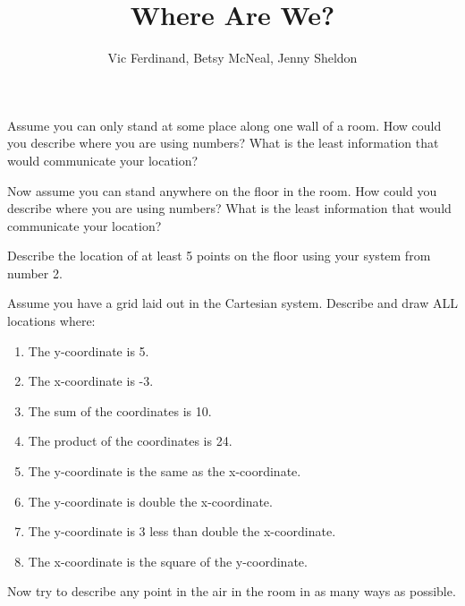 \documentclass{ximera}
\title{Where Are We?}
\author{Vic Ferdinand, Betsy McNeal, Jenny Sheldon}
\begin{document}
\begin{abstract}\end{abstract}
\maketitle


\begin{problem}
Assume you can only stand at some place along one wall of a room.  How could you describe where you are using numbers?  What is the least information that would communicate your location?

\end{problem}

\begin{problem}
Now assume you can stand anywhere on the floor in the room.  How could you describe where you are using numbers?  What is the least information that would communicate your location?


\end{problem}



\begin{problem}
Describe the location of at least 5 points on the floor using your system from number 2.
\end{problem}


\begin{problem}\label{WhereAreWe4}
Assume you have a grid laid out in the Cartesian system.  Describe and draw ALL locations where:
\begin{enumerate}
\item The y-coordinate is 5.
\item The x-coordinate is -3.
\item The sum of the coordinates is 10.
\item The product of the coordinates is 24.
\item The y-coordinate is the same as the x-coordinate.
\item The y-coordinate is double the x-coordinate.
\item The y-coordinate is 3 less than double the x-coordinate.
\item The x-coordinate is the square of the y-coordinate.
\end{enumerate}

\end{problem}

\begin{problem}
Now try to describe any point in the air in the room in as many ways as possible.
\end{problem}
\end{document}
